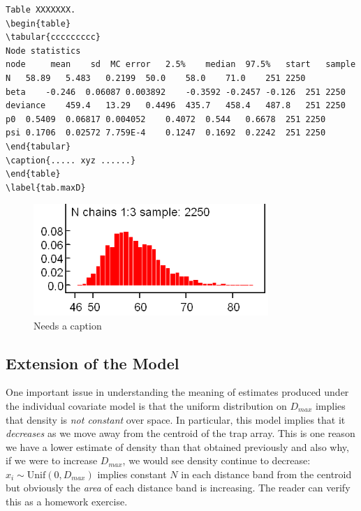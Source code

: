 \begin{verbatim}
Table XXXXXXX.
\begin{table}
\tabular{ccccccccc}
Node statistics
node	 mean	 sd	 MC error	2.5%	median	97.5%	start	sample
N	58.89	5.483	0.2199	50.0	58.0	71.0	251	2250
beta	-0.246	0.06087	0.003892	-0.3592	-0.2457	-0.126	251	2250
deviance	459.4	13.29	0.4496	435.7	458.4	487.8	251	2250
p0	0.5409	0.06817	0.004052	0.4072	0.544	0.6678	251	2250
psi	0.1706	0.02572	7.759E-4	0.1247	0.1692	0.2242	251	2250
\end{tabular}
\caption{..... xyz ......}
\end{table}
\label{tab.maxD}
\end{verbatim}

\begin{figure}
\begin{center}
\includegraphics[width=3.5in]{Ch3/figs/Nchains}
\end{center}
\caption{Needs a caption}
\label{closed.fig.ha}
\end{figure}

\subsection{Extension of the Model}

One important issue in understanding the meaning of estimates produced
under the individual covariate model is that the uniform distribution
on $D_{max}$ implies that density is {\it not constant} over space. In
particular, this model implies that it {\it decreases} as we move away
from the centroid of the trap array. This is one reason we have a
lower estimate of density than that obtained previously and also why,
if we were to increase $D_{max}$, we would see density continue to
decrease: $x_{i} \sim \mbox{Unif}(0,D_{max})$ implies constant $N$ in
each distance band from the centroid but obviously the {\it area} of
each distance band is increasing.  The reader can verify this as a
homework exercise.

